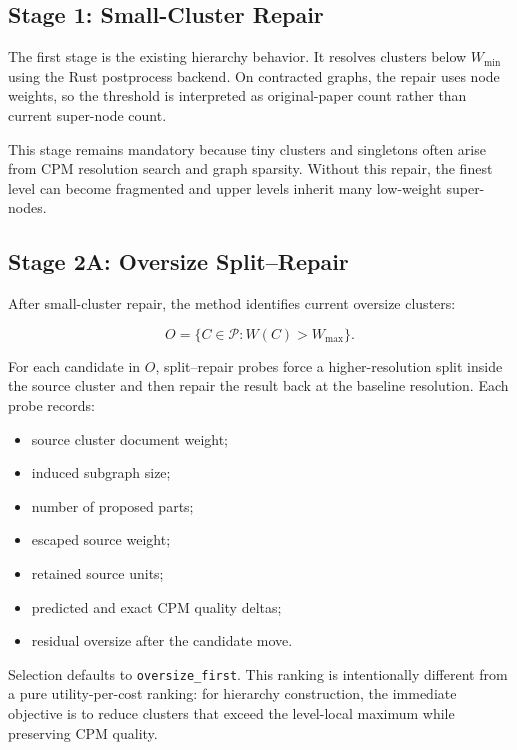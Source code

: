 \documentclass[11pt,a4paper]{article}
\begin{document}
\subsection{Stage 1: Small-Cluster Repair}

The first stage is the existing hierarchy behavior. It resolves clusters below
$W_{\min}$ using the Rust postprocess backend. On contracted graphs, the repair
uses node weights, so the threshold is interpreted as original-paper count
rather than current super-node count.

This stage remains mandatory because tiny clusters and singletons often arise
from CPM resolution search and graph sparsity. Without this repair, the finest
level can become fragmented and upper levels inherit many low-weight
super-nodes.

\subsection{Stage 2A: Oversize Split--Repair}

After small-cluster repair, the method identifies current oversize clusters:

\begin{equation}
    O = \{C \in \mathcal{P}: W(C) > W_{\max}\}.
\end{equation}

For each candidate in $O$, split--repair probes force a higher-resolution split
inside the source cluster and then repair the result back at the baseline
resolution. Each probe records:

\begin{itemize}[nosep]
    \item source cluster document weight;
    \item induced subgraph size;
    \item number of proposed parts;
    \item escaped source weight;
    \item retained source units;
    \item predicted and exact CPM quality deltas;
    \item residual oversize after the candidate move.
\end{itemize}

Selection defaults to \texttt{oversize\_first}. This ranking is intentionally
different from a pure utility-per-cost ranking: for hierarchy construction,
the immediate objective is to reduce clusters that exceed the level-local
maximum while preserving CPM quality.
\end{document}
